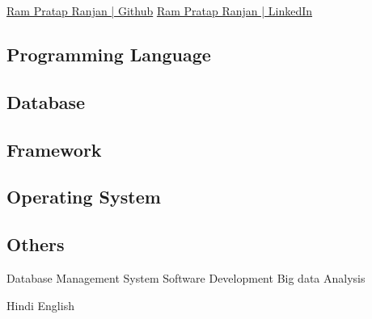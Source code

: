 







\href{https://github.com/rpranjan11}{Ram Pratap Ranjan | Github}\newline
\href{https://www.linkedin.com/in/ram-pratap-ranjan-rpranjan11}{Ram Pratap Ranjan | LinkedIn}

\subsection{Programming Language}
\subsection{Database}
\subsection{Framework}
\subsection{Operating System}

\subsection{Others}

{Database Management System}\newline
{Software Development}\newline
{Big data Analysis}

{Hindi}\newline
{English}


